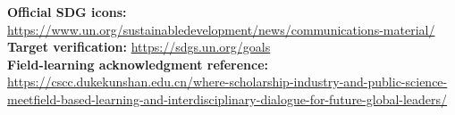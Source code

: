 \textbf{Official SDG icons:} \url{https://www.un.org/sustainabledevelopment/news/communications-material/}\\
\textbf{Target verification:} \url{https://sdgs.un.org/goals}\\
\textbf{Field-learning acknowledgment reference:} \url{https://cscc.dukekunshan.edu.cn/where-scholarship-industry-and-public-science-meetfield-based-learning-and-interdisciplinary-dialogue-for-future-global-leaders/}
